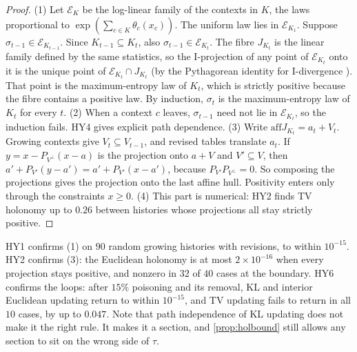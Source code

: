 \documentclass[11pt]{article}
\theoremstyle{definition}\newtheorem{definition}[theorem]{Definition}\newtheorem{remark}[theorem]{Remark}\newtheorem{example}[theorem]{Example}\newtheorem{problem}[theorem]{Open problem}\crefname{problem}{Problem}{Problems}
\begin{document}
\begin{proof}
(1) Let $\mathcal E_K$ be the log-linear family of the contexts in $K$, the laws proportional to $\exp(\sum_{c\in K}\theta_c(x_c))$. The uniform law lies in $\mathcal E_{K_1}$. Suppose $\sigma_{t-1}\in\mathcal E_{K_{t-1}}$. Since $K_{t-1}\subseteq K_t$, also $\sigma_{t-1}\in\mathcal E_{K_t}$. The fibre $J_{K_t}$ is the linear family defined by the same statistics, so the I-projection of any point of $\mathcal E_{K_t}$ onto it is the unique point of $\mathcal E_{K_t}\cap J_{K_t}$ (by the Pythagorean identity for I-divergence \cite{Csiszar1975}). That point is the maximum-entropy law of $K_t$, which is strictly positive because the fibre contains a positive law. By induction, $\sigma_t$ is the maximum-entropy law of $K_t$ for every $t$.
(2) When a context $c$ leaves, $\sigma_{t-1}$ need not lie in $\mathcal E_{K_t}$, so the induction fails. HY4 gives explicit path dependence.
(3) Write $\mathrm{aff}J_{K_t}=a_t+V_t$. Growing contexts give $V_t\subseteq V_{t-1}$, and revised tables translate $a_t$. If $y=x-P_{V^\perp}(x-a)$ is the projection onto $a+V$ and $V'\subseteq V$, then $a'+P_{V'}(y-a')=a'+P_{V'}(x-a')$, because $P_{V'}P_{V^\perp}=0$. So composing the projections gives the projection onto the last affine hull. Positivity enters only through the constraints $x\ge0$.
(4) This part is numerical: HY2 finds TV holonomy up to $0.26$ between histories whose projections all stay strictly positive.
\end{proof}

HY1 confirms (1) on $90$ random growing histories with revisions, to within $10^{-15}$. HY2 confirms (3): the Euclidean holonomy is at most $2\times10^{-16}$ when every projection stays positive, and nonzero in $32$ of $40$ cases at the boundary. HY6 confirms the loops: after $15\%$ poisoning and its removal, KL and interior Euclidean updating return to within $10^{-15}$, and TV updating fails to return in all $10$ cases, by up to $0.047$. Note that path independence of KL updating does not make it the right rule. It makes it a section, and \cref{prop:holbound} still allows any section to sit on the wrong side of $\tau$.
\end{document}
